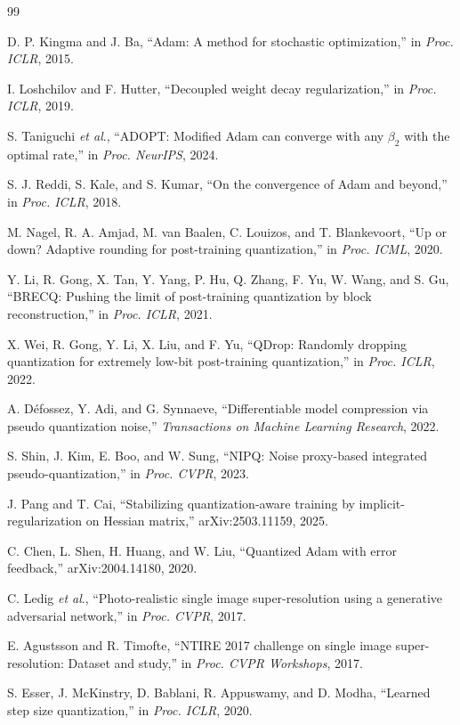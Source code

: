 \documentclass[journal]{IEEEtran}
\newcommand{\etal}{\textit{et al}.}
\begin{document}
\begin{thebibliography}{99}

D. P. Kingma and J. Ba, ``Adam: A method for stochastic optimization,'' in \emph{Proc. ICLR}, 2015.

I. Loshchilov and F. Hutter, ``Decoupled weight decay regularization,'' in \emph{Proc. ICLR}, 2019.

S. Taniguchi \etal, ``ADOPT: Modified Adam can converge with any $\beta_2$ with the optimal rate,'' in \emph{Proc. NeurIPS}, 2024.

S. J. Reddi, S. Kale, and S. Kumar, ``On the convergence of Adam and beyond,'' in \emph{Proc. ICLR}, 2018.

M. Nagel, R. A. Amjad, M. van Baalen, C. Louizos, and T. Blankevoort, ``Up or down? Adaptive rounding for post-training quantization,'' in \emph{Proc. ICML}, 2020.

Y. Li, R. Gong, X. Tan, Y. Yang, P. Hu, Q. Zhang, F. Yu, W. Wang, and S. Gu, ``BRECQ: Pushing the limit of post-training quantization by block reconstruction,'' in \emph{Proc. ICLR}, 2021.

X. Wei, R. Gong, Y. Li, X. Liu, and F. Yu, ``QDrop: Randomly dropping quantization for extremely low-bit post-training quantization,'' in \emph{Proc. ICLR}, 2022.

A. D\'efossez, Y. Adi, and G. Synnaeve, ``Differentiable model compression via pseudo quantization noise,'' \emph{Transactions on Machine Learning Research}, 2022.

S. Shin, J. Kim, E. Boo, and W. Sung, ``NIPQ: Noise proxy-based integrated pseudo-quantization,'' in \emph{Proc. CVPR}, 2023.

J. Pang and T. Cai, ``Stabilizing quantization-aware training by implicit-regularization on Hessian matrix,'' arXiv:2503.11159, 2025.

C. Chen, L. Shen, H. Huang, and W. Liu, ``Quantized Adam with error feedback,'' arXiv:2004.14180, 2020.

C. Ledig \etal, ``Photo-realistic single image super-resolution using a generative adversarial network,'' in \emph{Proc. CVPR}, 2017.

E. Agustsson and R. Timofte, ``NTIRE 2017 challenge on single image super-resolution: Dataset and study,'' in \emph{Proc. CVPR Workshops}, 2017.

S. Esser, J. McKinstry, D. Bablani, R. Appuswamy, and D. Modha, ``Learned step size quantization,'' in \emph{Proc. ICLR}, 2020.

\end{thebibliography}
\end{document}
